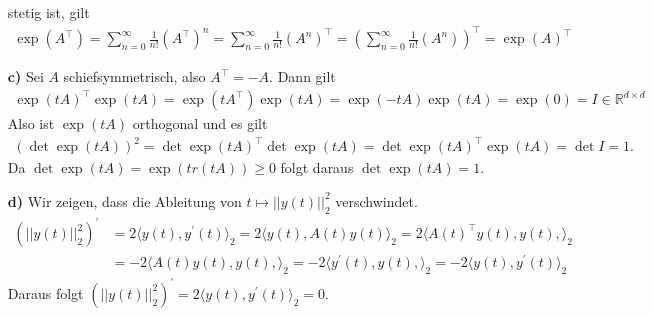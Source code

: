 \begin{solution}
\begin{itemize}
  stetig ist, gilt
  \begin{align*}
    \exp(A^{\top}) = \sum_{n = 0}^{\infty} \frac{1}{n!}(A^{\top})^n
    = \sum_{n = 0}^{\infty} \frac{1}{n!}(A^n)^{\top}
    = \left(\sum_{n = 0}^{\infty} \frac{1}{n!}(A^n)\right)^{\top}
    = \exp(A)^{\top}
  \end{align*}
\item [\textbf{c)}]
Sei $A$ schiefsymmetrisch, also $A^{\top} = -A$. Dann gilt
\begin{align*}
  \exp(tA)^{\top}\exp(tA) = \exp(tA^{\top})\exp(tA) = \exp(-tA)\exp(tA) = \exp(0) = I
  \in \mathbb{R}^{d \times d}
\end{align*}
Also ist $\exp(tA)$ orthogonal und es gilt
\begin{align*}
  \left(\det \exp(tA) \right)^2 = \det \exp(tA)^{\top} \det \exp(tA) =
  \det \exp(tA)^{\top}\exp(tA) = \det I = 1.
\end{align*}
Da $\det \exp(tA) = \exp(tr(tA)) \geq 0$ folgt daraus $\det \exp(tA) = 1$.
\item [\textbf{d)}]
Wir zeigen, dass die Ableitung von $t \mapsto ||y(t)||_2^2$ verschwindet.
\begin{align*}
  (||y(t)||_2^2)^{\prime} &= 2\langle y(t), y^{\prime}(t) \rangle_2
  = 2\langle y(t),A(t)y(t) \rangle_2 = 2\langle A(t)^{\top}y(t),  y(t), \rangle_2\\
  &= -2 \langle A(t)y(t),  y(t), \rangle_2
  = -2 \langle y^{\prime}(t),  y(t), \rangle_2
  = -2 \langle y(t), y^{\prime}(t)\rangle_2
\end{align*}
Daraus folgt $(||y(t)||_2^2)^{\prime} = 2\langle y(t), y^{\prime}(t)\rangle_2 = 0$.
\end{itemize}
\end{solution}
